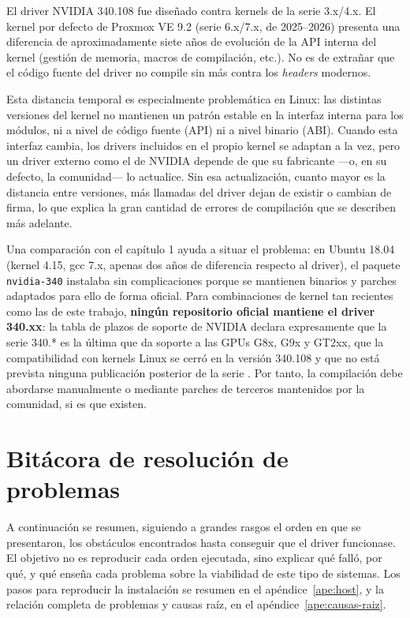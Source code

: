 El driver NVIDIA 340.108 fue diseñado contra kernels de la serie 3.x/4.x. El kernel por defecto de Proxmox VE 9.2 
(serie 6.x/7.x, de 2025--2026) presenta una diferencia de aproximadamente siete años de evolución de la API 
interna del kernel (gestión de memoria, macros de compilación, etc.). No es de extrañar que el código fuente del driver no 
compile sin más 
contra los \textit{headers} modernos.

Esta distancia temporal es especialmente problemática en Linux: las distintas versiones del kernel no mantienen un patrón 
estable en la 
interfaz interna para los módulos, ni a nivel de código fuente (API) ni a nivel binario (ABI). Cuando 
esta interfaz cambia, los drivers incluidos en el propio kernel se adaptan a la vez, pero un driver externo como el de 
NVIDIA depende de que su fabricante ---o, en su defecto, la comunidad--- lo actualice. Sin esa actualización, cuanto 
mayor es la distancia entre versiones, más llamadas del driver dejan de existir o cambian de firma, lo que explica la 
gran cantidad de errores de compilación que se describen más adelante.

Una comparación con el capítulo 1 ayuda a situar el problema: en Ubuntu 18.04 (kernel 4.15, gcc 7.x, apenas dos años 
de diferencia respecto al driver), el paquete \texttt{nvidia-340} instalaba sin complicaciones porque se mantienen 
binarios y parches adaptados para ello de forma oficial. Para combinaciones de kernel tan recientes como las de este trabajo, 
\textbf{ningún repositorio oficial mantiene el driver 340.xx}: la tabla de plazos de soporte de NVIDIA 
declara expresamente que la serie 340.* es la última que da soporte a las GPUs G8x, G9x y GT2xx, que la 
compatibilidad con kernels Linux se cerró en la versión 340.108 y que no está prevista ninguna publicación
posterior de la serie \cite{nvidia_legacy_support,nvidia_legacy_gpu}. Por tanto, la compilación debe abordarse 
manualmente o mediante parches de terceros mantenidos por la comunidad, si es que existen.

\section{Bitácora de resolución de problemas}

A continuación se resumen, siguiendo a grandes rasgos el orden en que se presentaron, los obstáculos encontrados hasta conseguir que el driver funcionase. El objetivo no es reproducir cada orden ejecutada, sino explicar qué falló, por qué, y qué enseña cada problema sobre la viabilidad de este tipo de sistemas. Los pasos para reproducir la instalación se resumen en el apéndice~\ref{ape:host}, y la relación completa de problemas y causas raíz, en el apéndice~\ref{ape:causas-raiz}.

